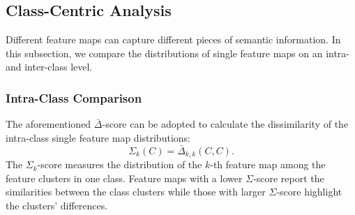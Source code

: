 \subsection{Class-Centric Analysis}

Different feature maps can capture different pieces of semantic information. In this subsection, we compare the distributions of single feature maps on an intra- and inter-class level.

\subsubsection{Intra-Class Comparison}

The aforementioned $\bar{\Delta}$-score can be adopted to calculate the dissimilarity of the intra-class single feature map distributions:
\begin{equation}
    \Sigma_k(C) = \bar{\Delta}_{k,k}(C, C).
    \label{eq:E}
\end{equation}
The $\Sigma_k$-score measures the distribution of the $k$-th feature map among the feature clusters in one class. Feature maps with a lower $\Sigma$-score report the similarities between the class clusters while those with larger $\Sigma$-score highlight the clusters' differences.

